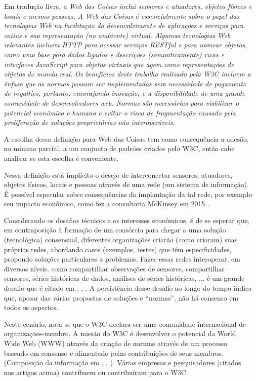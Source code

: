 Em tradução livre, \textit{a Web das Coisas inclui sensores e atuadores, objetos físicos e locais e mesmo pessoas. A Web das Coisas é essencialmente sobre o papel das tecnologias Web na facilitação do desenvolvimento de aplicações e serviços para coisas e sua representação (no ambiente) virtual. Algumas tecnologias Web relevantes incluem HTTP para acessar serviços RESTful e para nomear objetos, como uma base para dados ligados e descrições (semanticamente) ricas e interfaces JavaScript para objetos virtuais que agem como representações de objetos do mundo real. Os benefícios deste trabalho realizado pela W3C incluem a ênfase que as normas possam ser implementadas sem necessidade de pagamento de royalties, portanto, encorajando inovação, e a disponibilidade de uma grande comunidade de desenvolvedores web. Normas são necessárias para viabilizar o potencial econômico e humano e evitar o risco de fragmentação causado pela proliferação de soluções proprietárias não interoperáveis}.

A escolha dessa definição para Web das Coisas tem como consequência a adesão, no mínimo parcial, a um conjunto de padrões criados pelo W3C, então cabe analisar se esta escolha é conveniente.

Nessa definição está implícito o desejo de interconectar sensores, atuadores, objetos físicos, locais e pessoas através de uma rede (um sistema de informação). É possível especular sobre consequências da implantação da tal rede, por exemplo seu impacto econômico, como fez a consultoria McKinsey em 2015 \cite{manyika2015}. 

Considerando os desafios técnicos e os interesses econômicos, é de se esperar que, em contraposição à formação de um consórcio para chegar a uma solução (tecnológica) consensual, diferentes organizações criarão (como criaram) suas próprias redes, abordando casos (exemplos, testes) que têm especificidades, propondo soluções particulares a problemas. Fazer essas redes interoperar, em diversos níveis, como compartilhar observações de sensores, compartilhar sensores, séries históricas de dados, análises de séries históricas, ... é um grande desafio que é citado em \cite{Stirbu2008} \cite{Gyrard2017}. \cite{GARCIAMANGAS2019235}, \cite{OpenApíWoT2021}. A persistência desse desafio ao longo do tempo indica que, apesar das várias propostas de soluções e ``normas'', não há consenso em todos os aspectos.

Neste cenário, nota-se que o W3C declara ser uma comunidade internacional de organizações-membro. A missão do W3C é desenvolver o potencial da World Wide Web (WWW) através da criação de normas através de um processo baseado em consenso e alimentado pelas contribuições de seus membros. (Composição da informação em \cite{W3CAbout}, \cite{W3CFacts}, \cite{W3CMission}). Várias empresas e pesquisadores (citados nos artigos acima) contribuem ou contribuíram para o W3C.


